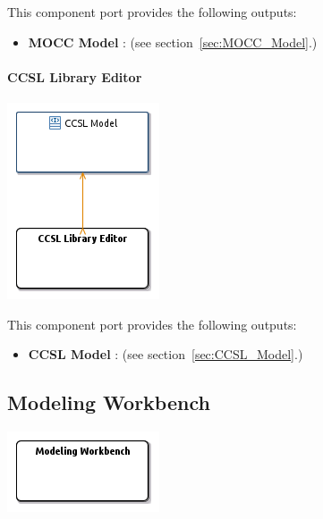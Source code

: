 \documentclass{gemoc} %
\begin{document}
This component port provides the following outputs:
\begin{itemize}
  \item \textbf{MOCC Model} :
(see section~\ref{sec:MOCC_Model}.)
\end{itemize}

\paragraph{CCSL Library Editor}
\label{sec:CCSL_Library_Editor}


\begin{center}
\includegraphics*[trim=0.0cm 0.0cm 0cm 0.0cm, clip=true]{../images/generated/Generated_CCSL_Library_Editor.png}
\end{center}


This component port provides the following outputs:
\begin{itemize}
  \item \textbf{CCSL Model} :
(see section~\ref{sec:CCSL_Model}.)
\end{itemize}




\subsection{Modeling Workbench}
\label{sec:Modeling_Workbench}
\begin{center}
\includegraphics*[trim=0.0cm 0.0cm 0cm 0.0cm, clip=true]{../images/generated/Generated_Modeling_Workbench.png}
\end{center}
\end{document}
